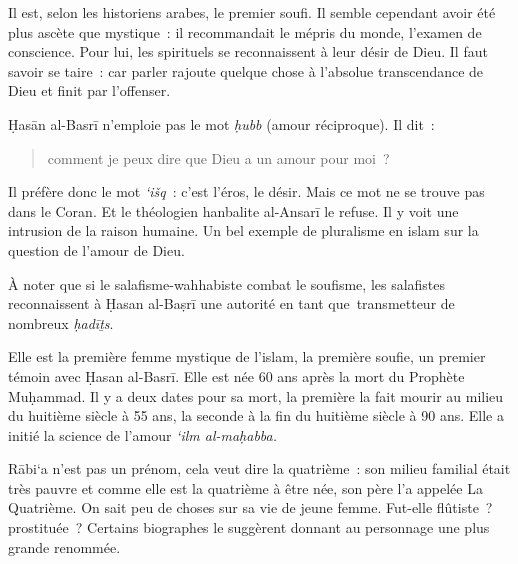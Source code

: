 

Il est, selon les historiens arabes, le premier soufi. Il semble
cependant avoir été plus ascète que mystique~: il recommandait le mépris
du monde, l'examen de conscience. Pour lui, les spirituels se
reconnaissent à leur désir de Dieu. Il faut savoir se taire~: car parler
rajoute quelque chose à l'absolue transcendance de Dieu et finit par
l'offenser.

Ḥasān al-Basrī n'emploie pas le mot \emph{ḥubb} (amour réciproque). Il
dit~: 
\begin{quote}
    comment je peux dire que Dieu a un amour pour moi~?
\end{quote}
 Il préfère
donc le mot \emph{`išq}~: c'est l'éros, le désir. Mais ce mot ne se
trouve pas dans le Coran. Et le théologien hanbalite al-Ansarī le
refuse. Il y voit une intrusion de la raison humaine. Un bel exemple de
pluralisme en islam sur la question de l'amour de Dieu.

À noter que si le salafisme-wahhabiste combat le soufisme, les
salafistes reconnaissent à Ḥasan al-Baṣrī une autorité en tant
que~transmetteur de nombreux \emph{ḥadīṯs}.


Elle est la première femme mystique de l'islam, la première soufie, un
premier témoin avec Ḥasan al-Basrī. Elle est née 60 ans après la mort du
Prophète Muḥammad. Il y a deux dates pour sa mort, la première la fait
mourir au milieu du huitième siècle à 55 ans, la seconde à la fin du
huitième siècle à 90 ans. Elle a initié la science de l'amour \emph{`ilm
al-maḥabba.}

Rābi`a n'est pas un prénom, cela veut dire la quatrième~: son milieu
familial était très pauvre et comme elle est la quatrième à être née,
son père l'a appelée La Quatrième. On sait peu de choses sur sa vie de
jeune femme. Fut-elle flûtiste~? prostituée~? Certains biographes le
suggèrent donnant au personnage une plus grande renommée.


